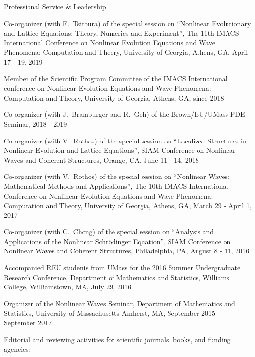 \documentclass[10pt]{article} %
\newenvironment{outerlist}[1][\enskip\textbullet]%
        {\begin{itemize}[#1]}{\end{itemize}%
         \vspace{-.6\baselineskip}}
\newenvironment{innerlist}[1][\enskip\textbullet]%
        {\begin{compactitem}[#1]}{\end{compactitem}}
\begin{document}
\begin{section}{Professional Service \& Leadership}
\begin{outerlist}
\begin{innerlist}
\item[$\triangleright$] Co-organizer (with F.~Tsitoura) of the special session on ``Nonlinear Evolutionary and Lattice Equations: Theory,
                        Numerics and Experiment'', The 11th IMACS International Conference on Nonlinear Evolution Equations and Wave Phenomena:
                        Computation and Theory, University of Georgia, Athens, GA, April 17 - 19, 2019
\item[$\triangleright$] Member of the Scientific Program Committee of the IMACS International conference on Nonlinear Evolution Equations
                        and Wave Phenomena: Computation and Theory, University of Georgia, Athens, GA, since 2018
\item[$\triangleright$] Co-organizer (with J.~Bramburger and R.~Goh) of the Brown/BU/UMass PDE Seminar, 2018 - 2019
\item[$\triangleright$] Co-organizer (with V.~Rothos) of the special session on ``Localized Structures in Nonlinear Evolution
                        and Lattice Equations'', SIAM Conference on Nonlinear Waves and Coherent Structures, Orange, CA, June 11 - 14, 2018
\item[$\triangleright$] Co-organizer (with V.~Rothos) of the special session on ``Nonlinear Waves: Mathematical Methods and Applications'',
                        The 10th IMACS International Conference on Nonlinear Evolution Equations and Wave Phenomena: Computation and Theory, %
                        University of Georgia, Athens, GA, March 29 - April 1, 2017
\item[$\triangleright$] Co-organizer (with C.~Chong) of the special session on ``Analysis and Applications of the Nonlinear
Schr\"odinger Equation'', SIAM Conference on Nonlinear Waves and Coherent Structures, Philadelphia, PA, August 8 - 11, 2016
\item[$\triangleright$] Accompanied REU students from UMass for the 2016 Summer Undergraduate Research Conference, Department of Mathematics
                        and Statistics, Williams College, Williamstown, MA, July 29, 2016
\item[$\triangleright$] Organizer of the Nonlinear Waves Seminar, Department of Mathematics and Statistics,
University of Massachusetts Amherst, MA, September 2015 - September 2017
\end{innerlist}
\item[$\bullet$] Editorial and reviewing activities for scientific journals, books, and funding agencies:

\end{outerlist}
\end{section}
\end{document}
